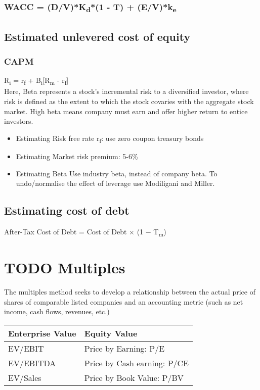 \documentclass[11pt]{article}
\begin{document}
\subsubsection*{WACC = (D/V)*K\textsubscript{d}*(1 - T) + (E/V)*k\textsubscript{e}}
\label{sec:orgfea7c0a}
\subsection*{Estimated unlevered cost of equity}
\label{sec:org3d5e582}
\subsubsection*{CAPM}
\label{sec:org4723a4c}
R\textsubscript{i} = r\textsubscript{f} + B\textsubscript{i}[R\textsubscript{m} - r\textsubscript{f}]\\
Here,  Beta represents a stock’s incremental risk to a diversified investor, where risk is defined as the extent to which the stock covaries with the aggregate stock market. High beta means company must earn and offer higher return to entice investors.\\
\begin{itemize}
\item Estimating Risk free rate r\textsubscript{f}: use zero coupon treasury bonds
\label{sec:org8d2b7a7}
\item Estimating Market risk premium: 5-6\%
\label{sec:org008d323}
\item Estimating Beta
\label{sec:org2c23043}
Use industry beta, instead of company beta. To undo/normalise the effect of leverage use Modiligani and Miller.\\
\end{itemize}
\subsection*{Estimating cost of debt}
\label{sec:org1e07710}
After-Tax Cost of Debt = Cost of Debt × (1 − T\textsubscript{m})\\
\section*{{\bfseries\sffamily TODO} Multiples}
\label{sec:org5c7aca4}
The multiples method seeks to develop a relationship between the actual price of shares of comparable listed companies and an accounting metric (such as net income, cash flows, revenues, etc.)\\

\begin{center}
\begin{tabular}{ll}
\hline
Enterprise Value & Equity Value\\
\hline
EV/EBIT & Price by Earning: P/E\\
EV/EBITDA & Price by Cash earning: P/CE\\
EV/Sales & Price by Book Value: P/BV\\
\hline
\end{tabular}
\end{center}
\end{document}
